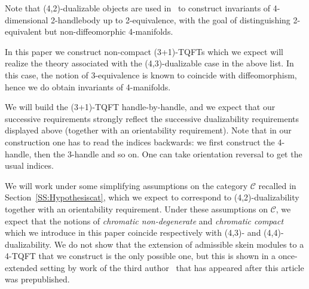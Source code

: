 \documentclass[pdftex]{sigma}
\numberwithin{equation}{section}
\numberwithin{theorem}{section}
\numberwithin{proposition}{section}
\numberwithin{definition}{section}
\numberwithin{lemma}{section}
\numberwithin{corollary}{section}
\numberwithin{remark}{section}
\numberwithin{example}{section}
\newcommand{\CC}{\mathcal{C}}
\begin{document}
Note that (4,2)-dualizable objects are used in~\cite{BD22, BD21} to construct invariants of 4-dimensional 2-handlebody up to 2-equivalence, with the goal of distinguishing 2-equivalent but non-dif\-feo\-mor\-phic 4-manifolds.

In this paper we construct non-compact (3+1)-TQFTs which we expect
will
realize the theory associated with the (4,3)-dualizable case in the above list. In this case, the notion of 3-equivalence is known to coincide with diffeomorphism, hence we do obtain invariants of 4-manifolds.

We will build the (3+1)-TQFT handle-by-handle, and we expect that our successive requirements strongly reflect the successive dualizability requirements displayed above (together with an orientability requirement). Note that in our construction one has to read the indices backwards: we first construct the 4-handle, then the 3-handle and so on. One can take orientation reversal to get the usual indices.

We will work under some simplifying assumptions on the category $\CC$ recalled in Section~\ref{SS:Hypothesiscat}, which we expect
to
correspond to (4,2)-dualizability together with an orientability requirement. Under these assumptions on $\CC$, we expect that the notions of \emph{chromatic non-degenerate} and \emph{chromatic compact} which we introduce in this paper coincide respectively with (4,3)- and (4,4)-dualizability. We do not show that the extension of admissible skein modules to a 4-TQFT that we construct is the only possible one, but this is shown in a once-extended setting by work of the third author~\cite[Theorem~6.1]{HaiounHandle} that
has
appeared after this article was prepublished.
\end{document}
